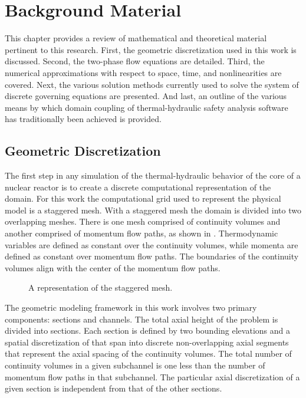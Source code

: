 \chapter{Background Material}
\label{chap:background}
This chapter provides a review of mathematical and theoretical material pertinent to this research.
First, the geometric discretization used in this work is discussed.
Second, the two-phase flow equations are detailed.
Third, the numerical approximations with respect to space, time, and nonlinearities are covered.
Next, the various solution methods currently used to solve the system of discrete governing equations are presented.
And last, an outline of the various means by which domain coupling of thermal-hydraulic safety analysis software has traditionally been achieved is provided.

\section{Geometric Discretization}
\label{sect:geometry}
The first step in any simulation of the thermal-hydraulic behavior of the core of a nuclear reactor is to create a discrete computational representation of the domain.
For this work the computational grid used to represent the physical model is a staggered mesh.
With a staggered mesh the domain is divided into two overlapping meshes.
There is one mesh comprised of continuity volumes and another comprised of momentum flow paths, as shown in .
Thermodynamic variables are defined as constant over the continuity volumes, while momenta are defined as constant over momentum flow paths.
The boundaries of the continuity volumes align with the center of the momentum flow paths.

\begin{figure}[ht!]
\centering

\caption{A representation of the staggered mesh.}
\label{fig:staggered_mesh}
\end{figure}

The geometric modeling framework in this work involves two primary components: sections and channels.
The total axial height of the problem is divided into sections.
Each section is defined by two bounding elevations and a spatial discretization of that span into discrete non-overlapping axial segments that represent the axial spacing of the continuity volumes.
The total number of continuity volumes in a given subchannel is one less than the number of momentum flow paths in that subchannel.
The particular axial discretization of a given section is independent from that of the other sections.

